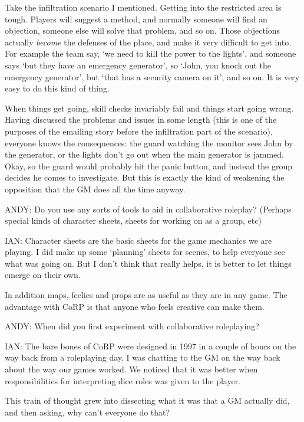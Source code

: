\documentclass[twoside]{book}
\begin{document}
\begin{description}
Take the infiltration scenario I mentioned. Getting into the restricted area is tough. Players will suggest a method, and normally someone will find an objection, someone else will solve that problem, and so on. Those objections actually {\it become} the defenses of the place, and make it very difficult to get into. For example the team say, `we need to kill the power to the lights', and someone says `but they have an emergency generator', so `John, you knock out the emergency generator', but `that has a security camera on it', and so on. It is very easy to do this kind of thing.

When things get going, skill checks invariably fail and things start going wrong. Having discussed the problems and issues in some length (this is one of the purposes of the emailing story before the infiltration part of the scenario), everyone knows the consequences: the guard watching the monitor sees John by the generator, or the lights don't go out when the main generator is jammed. Okay, so the guard would probably hit the panic button, and instead the group decides he comes to investigate. But this is exactly the kind of weakening the opposition that the GM does all the time anyway.

\item{ANDY:} Do you use any sorts of tools to aid in collaborative roleplay? (Perhaps special kinds of character sheets, sheets for working on as a group, etc)

\item{IAN:} Character sheets are the basic sheets for the game mechanics we are playing. I did make up some `planning' sheets for scenes, to help everyone see what was going on. But I don't think that really helps, it is better to let things emerge on their own.

In addition maps, feelies and props are as useful as they are in any game. The advantage with CoRP is that anyone who feels creative can make them.

\item{ANDY:} When did you first experiment with collaborative roleplaying?

\item{IAN:} The bare bones of CoRP were designed in 1997 in a couple of hours on the way back from a roleplaying day. I was chatting to the GM on the way back about the way our games worked. We noticed that it was better when responsibilities for interpreting dice roles was given to the player.

This train of thought grew into dissecting what it was that a GM actually did, and then asking, why can't everyone do that?


\end{description}
\end{document}

